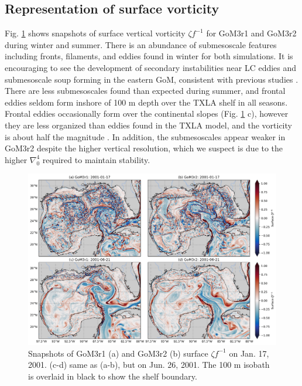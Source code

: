 \subsection{Representation of surface vorticity}
Fig. \ref{fig:gom3_rvort_planview} shows snapshots of surface vertical vorticity $\zeta f^{-1}$ for GoM3r1 and GoM3r2 during winter and summer. There is an abundance of submesoscale features including fronts, filaments, and eddies found in winter for both simulations. It is encouraging to see the development of secondary instabilities near LC eddies and submesoscale soup forming in the eastern GoM, consistent with previous studies \citep{Barkan_2017, bracco2019mesoscale, liu2021submesoscale}. There are less submesoscales found than expected during summer, and frontal eddies seldom form inshore of 100 m depth over the TXLA shelf in all seasons. Frontal eddies occasionally form over the continental slopes (Fig. \ref{fig:gom3_rvort_planview} c), however they are less organized than eddies found in the TXLA model, and the vorticity is about half the magnitude \citep[compare to Fig. 2 of ][]{Schlichting23}. In addition, the submesoscales appear weaker in GoM3r2 despite the higher vertical resolution, which we suspect is due to the higher $\nabla_0^4$ required to maintain stability. 

\begin{figure}[t]
\centerline{\includegraphics[width=\textwidth]{figures/scgsr/GoM3_rvort_comp2.jpg}}
    \caption{Snapshots of GoM3r1 (a) and GoM3r2 (b) surface $\zeta f^{-1}$ on Jan. 17, 2001. (c-d) same as (a-b), but on Jun. 26, 2001. The 100 m isobath is overlaid in black to show the shelf boundary.}
    \label{fig:gom3_rvort_planview}
\end{figure}

